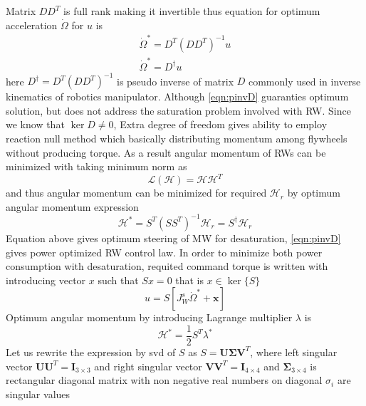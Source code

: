 Matrix $\displaystyle DD^{T}$ is full rank making it invertible thus equation for optimum acceleration $\displaystyle \dot{\Omega }$ for $\displaystyle u$ is
\begin{gather}
\dot{\Omega }^{*} =D^{T}\left( DD^{T}\right)^{-1} u\\
\dot{\Omega }^{*} =D^{\dagger } u
\label{eqn:pinvD}
\end{gather}
here $\displaystyle D^{\dagger } =D^{T}\left( DD^{T}\right)^{-1}$ is pseudo inverse of matrix $\displaystyle D$ commonly used in inverse kinematics of robotics manipulator. Although \autoref{eqn:pinvD} guaranties optimum solution, but does not address the saturation problem involved with RW. Since we know that $\displaystyle \ker D\neq 0$, Extra degree of freedom gives ability to employ reaction null method which basically distributing momentum among flywheels without producing torque. As a result angular momentum of RWs can be minimized with taking minimum norm as
\begin{equation}
\mathcal{L}(\mathcal{H}) =\mathcal{HH}^{T}
\end{equation}
and thus angular momentum can be minimized for required $\displaystyle \mathcal{H}_{r}$ by optimum angular momentum expression
\begin{equation}
\mathcal{H}^{*} =S^{T}\left( SS^{T}\right)^{-1}\mathcal{H}_{r} =S^{\dagger }\mathcal{H}_{r}
\end{equation}
Equation above gives optimum steering of MW for desaturation, \autoref{eqn:pinvD} gives power optimized RW control law. In order to minimize both power consumption with desaturation, requited command torque is written with introducing vector $\displaystyle x$ such that $\displaystyle Sx=0$ that is $\displaystyle x\in \ker\{S\}$
\begin{equation}
u =S\left[ J^{s}_{W}\dot{\Omega }^{*} +\mathbf{x}\right]
\label{eqn:OptiRW_and_disat}
\end{equation}
Optimum angular momentum by introducing Lagrange multiplier $\displaystyle \lambda $ is
\begin{equation}
\mathcal{H}^{*} =\frac{1}{2} S^{T} \lambda ^{*}
\label{eqn:OptimumMomentum}
\end{equation}
Let us rewrite the expression by \acrfull{svd} of $\displaystyle S$ as $\displaystyle S=\mathbf{U\Sigma V}^{T}$, where left singular vector $\displaystyle \mathbf{UU}^{T} =\mathbf{I}_{3\times 3}$ and right singular vector $\displaystyle \mathbf{VV}^{T} =\mathbf{I}_{4\times 4}$ and $\displaystyle \mathbf{\Sigma }_{3\times 4}$ is rectangular diagonal matrix with non negative real numbers on diagonal $\displaystyle \sigma _{i}$ are singular values
